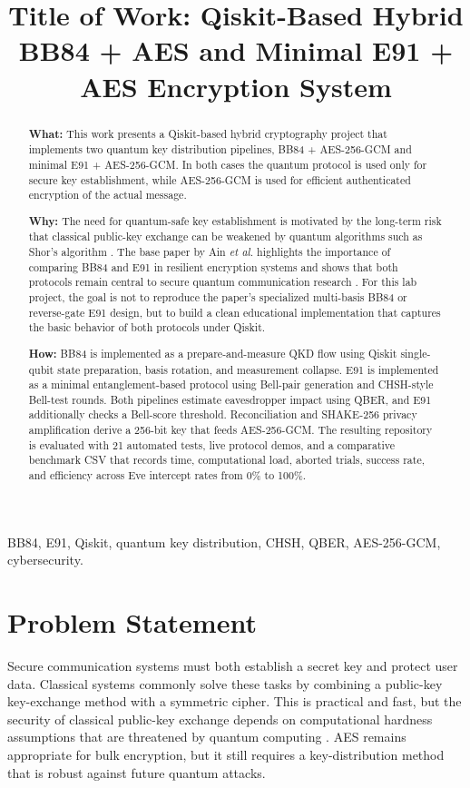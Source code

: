 \documentclass[conference]{IEEEtran}
\title{Title of Work: Qiskit-Based Hybrid BB84 + AES and Minimal E91 + AES Encryption System}
\author{
\IEEEauthorblockN{Cybersecurity Project}
\IEEEauthorblockA{
Department of Cybersecurity\\
Hybrid Quantum-Classical Cryptography Lab}
}
\begin{document}
\maketitle

\begin{abstract}
\textbf{What:} This work presents a Qiskit-based hybrid cryptography project that implements two quantum key distribution pipelines, BB84 + AES-256-GCM and minimal E91 + AES-256-GCM. In both cases the quantum protocol is used only for secure key establishment, while AES-256-GCM is used for efficient authenticated encryption of the actual message.

\textbf{Why:} The need for quantum-safe key establishment is motivated by the long-term risk that classical public-key exchange can be weakened by quantum algorithms such as Shor's algorithm \cite{shor1997polynomial}. The base paper by Ain \emph{et al.} highlights the importance of comparing BB84 and E91 in resilient encryption systems and shows that both protocols remain central to secure quantum communication research \cite{ain2025novel}. For this lab project, the goal is not to reproduce the paper's specialized multi-basis BB84 or reverse-gate E91 design, but to build a clean educational implementation that captures the basic behavior of both protocols under Qiskit.

\textbf{How:} BB84 is implemented as a prepare-and-measure QKD flow using Qiskit single-qubit state preparation, basis rotation, and measurement collapse. E91 is implemented as a minimal entanglement-based protocol using Bell-pair generation and CHSH-style Bell-test rounds. Both pipelines estimate eavesdropper impact using QBER, and E91 additionally checks a Bell-score threshold. Reconciliation and SHAKE-256 privacy amplification derive a 256-bit key that feeds AES-256-GCM. The resulting repository is evaluated with 21 automated tests, live protocol demos, and a comparative benchmark CSV that records time, computational load, aborted trials, success rate, and efficiency across Eve intercept rates from 0\% to 100\%.
\end{abstract}

\begin{IEEEkeywords}
BB84, E91, Qiskit, quantum key distribution, CHSH, QBER, AES-256-GCM, cybersecurity.
\end{IEEEkeywords}

\section{Problem Statement}
Secure communication systems must both establish a secret key and protect user data. Classical systems commonly solve these tasks by combining a public-key key-exchange method with a symmetric cipher. This is practical and fast, but the security of classical public-key exchange depends on computational hardness assumptions that are threatened by quantum computing \cite{shor1997polynomial}. AES remains appropriate for bulk encryption, but it still requires a key-distribution method that is robust against future quantum attacks.
\end{document}
